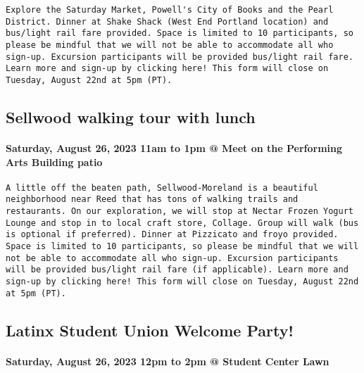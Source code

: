\documentclass[
]{article}
\begin{document}
\begin{verbatim}
Explore the Saturday Market, Powell's City of Books and the Pearl District. Dinner at Shake Shack (West End Portland location) and bus/light rail fare provided. Space is limited to 10 participants, so please be mindful that we will not be able to accommodate all who sign-up. Excursion participants will be provided bus/light rail fare. Learn more and sign-up by clicking here! This form will close on Tuesday, August 22nd at 5pm (PT).
\end{verbatim}

\hypertarget{sellwood-walking-tour-with-lunch}{%
\subsection{Sellwood walking tour with
lunch}\label{sellwood-walking-tour-with-lunch}}

\hypertarget{saturday-august-26-2023-11am-to-1pm-meet-on-the-performing-arts-building-patio}{%
\paragraph{Saturday, August 26, 2023 11am to 1pm @ Meet on the
Performing Arts Building
patio}\label{saturday-august-26-2023-11am-to-1pm-meet-on-the-performing-arts-building-patio}}

\begin{verbatim}
A little off the beaten path, Sellwood-Moreland is a beautiful neighborhood near Reed that has tons of walking trails and restaurants. On our exploration, we will stop at Nectar Frozen Yogurt Lounge and stop in to local craft store, Collage. Group will walk (bus is optional if preferred). Dinner at Pizzicato and froyo provided. Space is limited to 10 participants, so please be mindful that we will not be able to accommodate all who sign-up. Excursion participants will be provided bus/light rail fare (if applicable). Learn more and sign-up by clicking here! This form will close on Tuesday, August 22nd at 5pm (PT).
\end{verbatim}

\hypertarget{latinx-student-union-welcome-party}{%
\subsection{Latinx Student Union Welcome
Party!}\label{latinx-student-union-welcome-party}}

\hypertarget{saturday-august-26-2023-12pm-to-2pm-student-center-lawn}{%
\paragraph{Saturday, August 26, 2023 12pm to 2pm @ Student Center
Lawn}\label{saturday-august-26-2023-12pm-to-2pm-student-center-lawn}}
\end{document}
